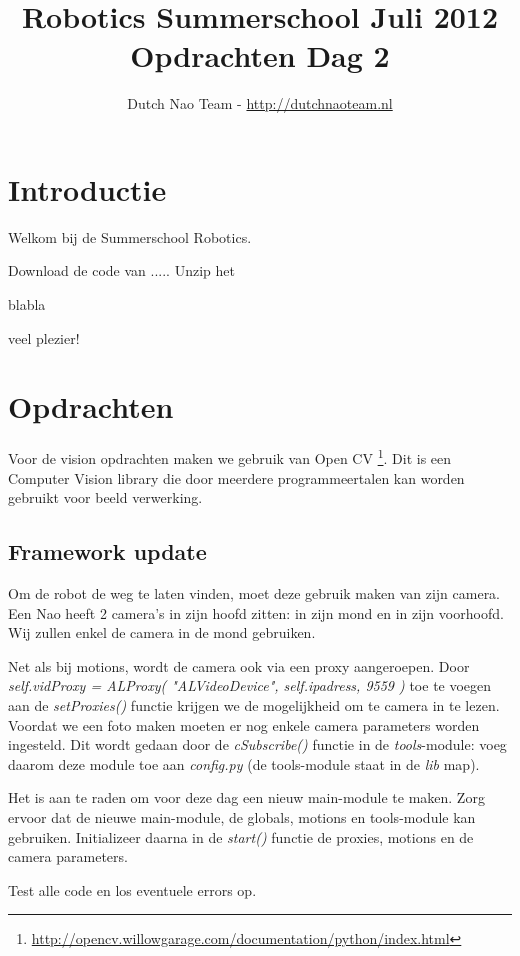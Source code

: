 \documentclass[a4paper]{article}
\title{\textbf{Robotics Summerschool Juli 2012} \\ Opdrachten Dag 2}
\author{Dutch Nao Team - \url{http://dutchnaoteam.nl}}
\date{}
\begin{document}
\maketitle

\section{Introductie}
Welkom bij de Summerschool Robotics.

Download de code van .....
Unzip het 

blabla

veel plezier!


\tableofcontents

\newpage


\section{Opdrachten}
Voor de vision opdrachten maken we gebruik van Open CV \footnote{\url{http://opencv.willowgarage.com/documentation/python/index.html}}. Dit is een Computer Vision library die door meerdere programmeertalen kan worden gebruikt voor beeld verwerking.

\subsection{Framework update}
Om de robot de weg te laten vinden, moet deze gebruik maken van zijn camera. Een Nao heeft 2 camera's in zijn hoofd zitten: in zijn mond en in zijn voorhoofd. Wij zullen enkel de camera in de mond gebruiken.

Net als bij motions, wordt de camera ook via een proxy aangeroepen. Door \textit{self.vidProxy = ALProxy( "ALVideoDevice", self.ipadress, 9559 )} toe te voegen aan de \textit{setProxies()} functie krijgen we de mogelijkheid om te camera in te lezen. Voordat we een foto maken moeten er nog enkele camera parameters worden ingesteld. Dit wordt gedaan door de \textit{cSubscribe()} functie in de \textit{tools}-module: voeg daarom deze module toe aan \textit{config.py} (de tools-module staat in de \textit{lib} map).

Het is aan te raden om voor deze dag een nieuw main-module te maken. Zorg ervoor dat de nieuwe main-module, de globals, motions en tools-module kan gebruiken. Initializeer daarna in de \textit{start()} functie de proxies, motions en de camera parameters.

Test alle code en los eventuele errors op.
\end{document}
